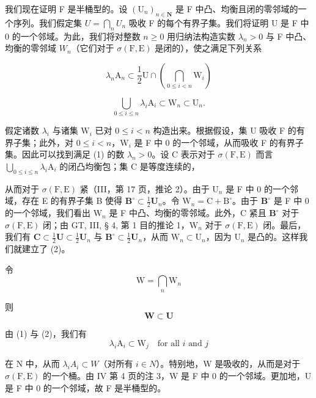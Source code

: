 我们现在证明 F 是半桶型的。设 \((\mathrm{U}_{n})_{n\in\mathbf{N}}\) 是 F 中凸、均衡且闭的零邻域的一个序列。我们假定集 \(U=\bigcap_{n}U_{n}\) 吸收 F 的每个有界子集。我们将证明 U 是 F 中 0 的一个邻域。为此，我们将对整数 \(n\geqslant0\) 用归纳法构造实数 \(\lambda_{n}>0\) 与 F 中凸、均衡的零邻域 \(W_{n}\)（它们对于 \(\sigma(\mathrm{F},\mathrm{E})\) 是闭的），使之满足下列关系

\[
\lambda_ {n} \mathrm{A} _ {n} \subset \frac {1}{2} \mathrm{U} \cap \left(\bigcap_ {0 \leqslant i <   n} \mathrm{W} _ {i}\right)\tag{1}
\]

\[
\bigcup_ {0 \leqslant i \leqslant n} \lambda_ {i} \mathrm{A} _ {i} \subset \mathrm{W} _ {n} \subset \mathrm{U} _ {n}.\tag{2}
\]

假定诸数 \(\lambda_{i}\) 与诸集 \(\mathrm{W}_i\) 已对 \(0 \leqslant i < n\) 构造出来。根据假设，集 U 吸收 F 的有界子集；此外，对 \(0 \leqslant i < n\)，\(\mathrm{W}_i\) 是 F 中 0 的一个邻域，从而吸收 F 的有界子集。因此可以找到满足 (1) 的数 \(\lambda_{n} > 0\)。设 C 表示对于 \(\sigma(\mathrm{F}, \mathrm{E})\) 而言 \(\bigcup_{0 \leqslant i \leqslant n} \lambda_i \mathrm{A}_i\) 的闭凸均衡包；集 C 是等度连续的，

从而对于 \(\sigma(\mathrm{F},\mathrm{E})\) 紧（III，第 17 页，推论 2）。由于 \(\mathrm{U}_n\) 是 F 中 0 的一个邻域，存在 E 的有界子集 B 使得 \(\mathbf{B}^{\circ}\subset\frac{1}{2}\mathbf{U}_{n}\)。令 \(\mathrm{W}_n=\mathrm{C}+\mathrm{B}^{\circ}\)。由于 \(\mathbf{B}^{\circ}\) 是 F 中 0 的一个邻域，我们看出 \(\mathrm{W}_n\) 是 F 中凸、均衡的零邻域。此外，C 紧且 \(\mathbf{B}^{\circ}\) 对于 \(\sigma(\mathrm{F},\mathrm{E})\) 闭；由 GT, III, § 4, 第 1 目的推论 1，\(\mathrm{W}_n\) 对于 \(\sigma(\mathrm{F},\mathrm{E})\) 闭。最后，我们有 \(\mathbf{C}\subset\frac{1}{2}\mathbf{U}\subset\frac{1}{2}\mathbf{U}_n\) 与 \(\mathbf{B}^{\circ}\subset\frac{1}{2}\mathbf{U}_n\)，从而 \(\mathrm{W}_n\subset\mathrm{U}_n\)，因为 \(\mathrm{U}_n\) 是凸的。这样我们就建立了 (2)。

令
\[
\mathrm{W} = \bigcap_ {n} \mathrm{W} _ {n}
\]

则
\[
\mathbf {W} \subset \mathbf {U}
\]

由 (1) 与 (2)，我们有
\[
\lambda_ {i} \mathrm{A} _ {i} \subset \mathrm{W} _ {j} \quad \text {for all } i \text { and } j
\]

在 N 中，从而 \(\lambda_{i}A_{i}\subset W\)（对所有 \(i\in N\)）。特别地，W 是吸收的，从而是对于 \(\sigma(\mathrm{F},\mathrm{E})\) 的一个桶。由 IV 第 4 页的注 3，W 是 F 中 0 的一个邻域。更加地，U 是 F 中 0 的一个邻域，故 F 是半桶型的。

